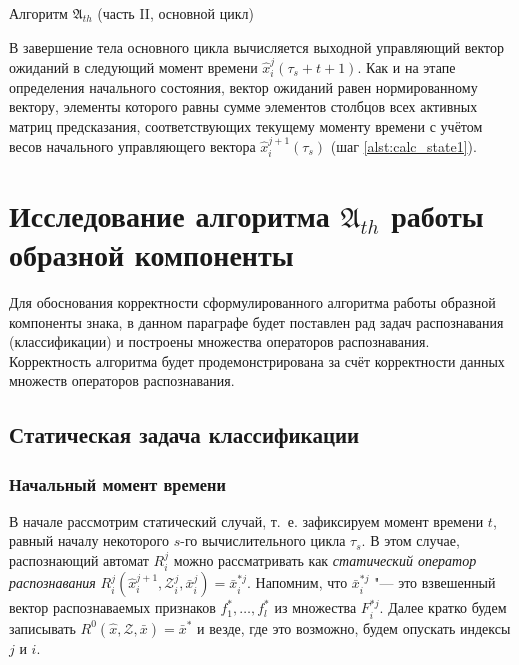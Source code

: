 \begin{algorithm}[H]
	\caption{Алгоритм $\mathfrak{A}_{th}$ (часть II, основной цикл)}\label{alg:th_cycle}
	\begin{algorithmic}[1]
		
	\end{algorithmic}
\end{algorithm}
		
В завершение тела основного цикла вычисляется выходной управляющий вектор ожиданий в следующий момент времени $\hat x_i^j(\tau_s+t+1)$. Как и на этапе определения начального состояния, вектор ожиданий равен нормированному вектору, элементы которого равны сумме элементов столбцов всех активных матриц предсказания, соответствующих текущему моменту времени с учётом весов начального управляющего вектора $\hat x_i^{j+1}(\tau_s)$ (шаг \ref{alst:calc_state1}).

\section{Исследование алгоритма $\mathfrak A_{th}$ работы образной компоненты}\label{sect3_2}

Для обоснования корректности сформулированного алгоритма работы образной компоненты знака, в данном параграфе будет поставлен рад задач распознавания (классификации) и построены множества операторов распознавания. Корректность алгоритма будет продемонстрирована за счёт корректности данных множеств операторов распознавания.

\subsection{Статическая задача классификации}

\subsubsection{Начальный момент времени}
В начале рассмотрим статический случай, т.~е. зафиксируем момент времени $t$, равный началу некоторого $s$-го вычислительного цикла $\tau_s$. В этом случае, распознающий автомат $R_i^j$ можно рассматривать как \textit{статический оператор распознавания} $R_i^j(\hat{x}_i^{j+1},\mathcal{Z}_i^j,\bar{x}_i^j)=\bar{x}_i^{*j}$. Напомним, что $\bar{x}_i^{*j}$ "--- это взвешенный вектор распознаваемых признаков $f_1^*,\dots,f_l^*$ из множества $F_i^{*j}$. Далее кратко будем записывать $R^0(\hat{x},\mathcal{Z},\bar{x})=\bar{x}^*$ и везде, где это возможно, будем опускать индексы $j$ и $i$.
	
